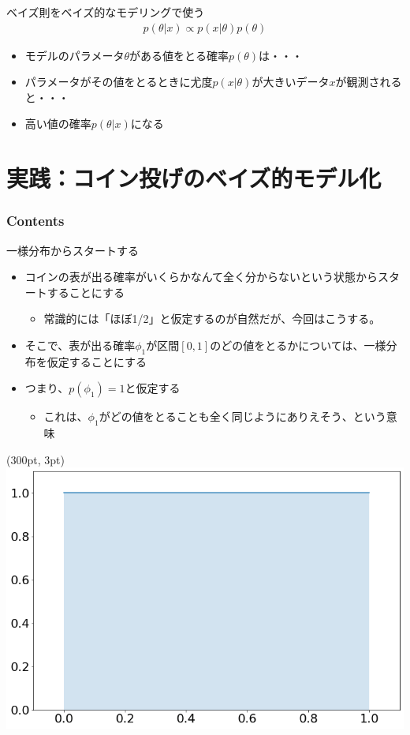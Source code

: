 \documentclass[aspectratio=169,unicode,dvipdfmx,14pt]{beamer}
\begin{document}
\begin{frame}{ベイズ則をベイズ的なモデリングで使う}
\vspace{-.4in}
{\Large
\begin{align}
p(\theta|x) \propto p(x|\theta)p(\theta)
\end{align}
}%
\vspace{-.2in}
\begin{itemize}
\item モデルのパラメータ$\theta$がある値をとる確率$p(\theta)$は・・・
\item パラメータがその値をとるときに尤度$p(x|\theta)$が大きいデータ$x$が観測されると・・・
\item 高い値の確率$p(\theta|x)$になる
\end{itemize}
\end{frame}

\section{実践：コイン投げのベイズ的モデル化}

\begin{frame}\frametitle{Contents}
\Large \tableofcontents[currentsection]
\end{frame}

\begin{frame}{一様分布からスタートする}
\begin{itemize}
\item コインの表が出る確率がいくらかなんて全く分からないという状態からスタートすることにする
\begin{itemize}
\item 常識的には「ほぼ1/2」と仮定するのが自然だが、今回はこうする。
\end{itemize}
\item そこで、表が出る確率$\phi_1$が区間$[0,1]$のどの値をとるかについては、一様分布を仮定することにする
\item つまり、$p(\phi_1)=1$と仮定する
\begin{itemize}
\item これは、$\phi_1$がどの値をとることも全く同じようにありえそう、という意味
\end{itemize}
\end{itemize}
\begin{textblock*}{0.4\linewidth}(300pt, 3pt)
    \centering
    \includegraphics[width=0.5\linewidth]{uniform_dist.png}
\end{textblock*}
\end{frame}
\end{document}
